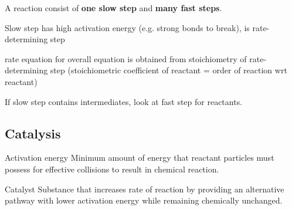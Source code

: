 A reaction consist of \textbf{one slow step} and \textbf{many fast steps}.

Slow step has high activation energy (e.g. strong bonds to break), is rate-determining step

rate equation for overall equation is obtained from stoichiometry of rate-determining step (stoichiometric coefficient of reactant = order of reaction wrt reactant)
\begin{remark}
If slow step contains intermediates, look at fast step for reactants.
\end{remark}

\subsection{Catalysis}

\begin{defn}{Activation energy}{}
Minimum amount of energy that reactant particles must possess for effective collisions to result in chemical reaction.
\end{defn}

\begin{defn}{Catalyst}{}
Substance that increases rate of reaction by providing an alternative pathway with lower activation energy while remaining chemically unchanged.
\end{defn}



\pagebreak

